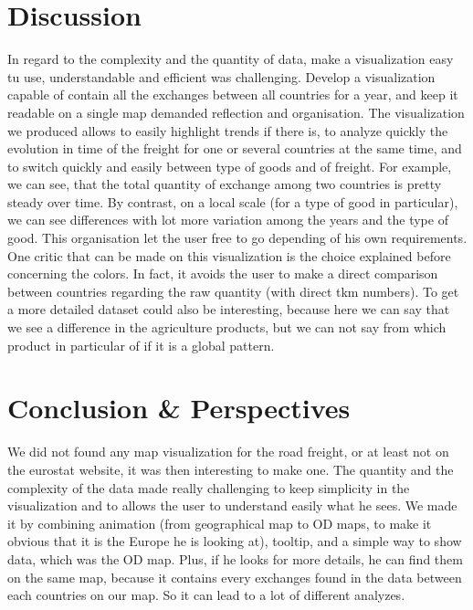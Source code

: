 \documentclass{vgtc}
\begin{document}
\section{Discussion}
In regard to the complexity and the quantity of data, make a visualization easy tu use, understandable and efficient was challenging. Develop a visualization capable of contain all the exchanges between all countries for a year, and keep it readable on a single map demanded reflection and organisation. The visualization we produced allows to easily highlight trends if there is, to analyze quickly the evolution in time of the freight for one or several countries at the same time, and to switch quickly and easily between type of goods and of freight. For example, we can see, that the total quantity of exchange among two countries is pretty steady over time. By contrast, on a local scale (for a type of good in particular), we can see differences with lot more variation among the years and the type of good. This organisation let the user free to go depending of his own requirements.
One critic that can be made on this visualization is the choice explained before concerning the colors. In fact, it avoids the user to make a direct comparison between countries regarding the raw quantity (with direct tkm numbers). 
To get a more detailed dataset could also be interesting, because here we can say that we see a difference in the agriculture products, but we can not say from which product in particular of if it is a global pattern.


\section{Conclusion \& Perspectives}
We did not found any map visualization for the road freight, or at least not on the eurostat website, it was then interesting to make one. The quantity and the complexity of the data made really challenging to keep simplicity in the visualization and to allows the user to understand easily what he sees. We made it by combining animation (from geographical map to OD maps, to make it obvious that it is the Europe he is looking at), tooltip, and a simple way to show data, which was the OD map. Plus, if he looks for more details, he can find them on the same map, because it contains every exchanges found in the data between each countries on our map. So it can lead to a lot of different analyzes. 




\end{document}
